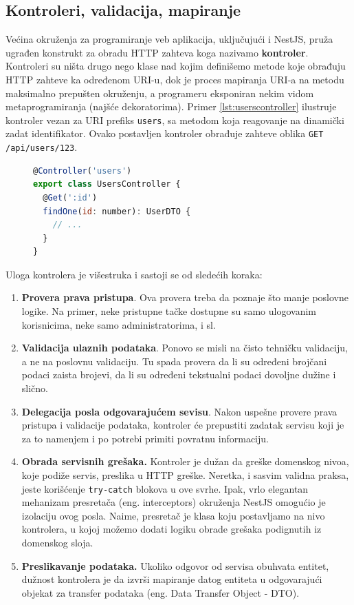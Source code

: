 \documentclass[12pt,oneside]{memoir}
\begin{document}
\subsection{Kontroleri, validacija, mapiranje}

Većina okruženja za programiranje veb aplikacija, uključujući i NestJS, pruža ugrađen konstrukt za obradu HTTP zahteva koga nazivamo \textbf{kontroler}. Kontroleri su ništa drugo nego klase nad kojim definišemo metode koje obrađuju HTTP zahteve ka određenom URI-u, dok je proces mapiranja URI-a na metodu maksimalno prepušten okruženju, a programeru eksponiran nekim vidom metaprogramiranja (najšće dekoratorima). Primer \ref{lst:userscontroller} ilustruje kontroler vezan za URI prefiks \verb|users|, sa metodom koja reagovanje na dinamički zadat identifikator. Ovako postavljen kontroler obrađuje zahteve oblika \verb|GET /api/users/123|.

\begin{figure}[h]
\begin{lstlisting}[language=JavaScript, style=ES6, caption={Primer kontrolera.}, label={lst:userscontroller}]
@Controller('users')
export class UsersController {
  @Get(':id')
  findOne(id: number): UserDTO {
    // ...
  }
}
\end{lstlisting}
\end{figure}

Uloga kontrolera je višestruka i sastoji se od sledećih koraka:
\begin{enumerate}
    \item \textbf{Provera prava pristupa}. Ova provera treba da poznaje što manje poslovne logike. Na primer, neke pristupne tačke dostupne su samo ulogovanim korisnicima, neke samo administratorima, i sl.
    \item \textbf{Validacija ulaznih podataka}. Ponovo se misli na čisto tehničku validaciju, a ne na poslovnu validaciju. Tu spada provera da li su određeni brojčani podaci zaista brojevi, da li su određeni tekstualni podaci dovoljne dužine i slično.
    \item \textbf{Delegacija posla odgovarajućem sevisu}. Nakon uspešne provere prava pristupa i validacije podataka, kontroler će prepustiti zadatak servisu koji je za to namenjem i po potrebi primiti povratnu informaciju.
    \item \textbf{Obrada servisnih grešaka.} Kontroler je dužan da greške domenskog nivoa, koje podiže servis, preslika u HTTP greške. Neretka, i sasvim validna praksa, jeste korišćenje \verb|try-catch| blokova u ove svrhe. Ipak, vrlo elegantan mehanizam presretača (eng. interceptors) okruženja NestJS omogućio je izolaciju ovog posla. Naime, presretač je klasa koju postavljamo na nivo kontrolera, u kojoj možemo dodati logiku obrade grešaka podignutih iz domenskog sloja.
    \item \textbf{Preslikavanje podataka.} Ukoliko odgovor od servisa obuhvata entitet, dužnost kontrolera je da izvrši mapiranje datog entiteta u odgovarajući objekat za transfer podataka (eng. Data Transfer Object - DTO).
\end{enumerate}
\end{document}
